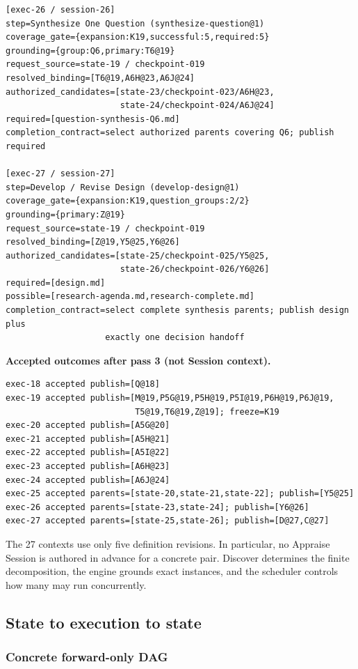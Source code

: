 \documentclass[11pt]{article}
\begin{document}
\begin{lstlisting}[style=playbook,basicstyle=\ttfamily\tiny]
[exec-26 / session-26]
step=Synthesize One Question (synthesize-question@1)
coverage_gate={expansion:K19,successful:5,required:5}
grounding={group:Q6,primary:T6@19}
request_source=state-19 / checkpoint-019
resolved_binding=[T6@19,A6H@23,A6J@24]
authorized_candidates=[state-23/checkpoint-023/A6H@23,
                       state-24/checkpoint-024/A6J@24]
required=[question-synthesis-Q6.md]
completion_contract=select authorized parents covering Q6; publish required

[exec-27 / session-27]
step=Develop / Revise Design (develop-design@1)
coverage_gate={expansion:K19,question_groups:2/2}
grounding={primary:Z@19}
request_source=state-19 / checkpoint-019
resolved_binding=[Z@19,Y5@25,Y6@26]
authorized_candidates=[state-25/checkpoint-025/Y5@25,
                       state-26/checkpoint-026/Y6@26]
required=[design.md]
possible=[research-agenda.md,research-complete.md]
completion_contract=select complete synthesis parents; publish design plus
                    exactly one decision handoff
\end{lstlisting}

\noindent\textbf{Accepted outcomes after pass 3 (not Session context).}
\begin{lstlisting}[style=playbook,basicstyle=\ttfamily\scriptsize]
exec-18 accepted publish=[Q@18]
exec-19 accepted publish=[M@19,P5G@19,P5H@19,P5I@19,P6H@19,P6J@19,
                          T5@19,T6@19,Z@19]; freeze=K19
exec-20 accepted publish=[A5G@20]
exec-21 accepted publish=[A5H@21]
exec-22 accepted publish=[A5I@22]
exec-23 accepted publish=[A6H@23]
exec-24 accepted publish=[A6J@24]
exec-25 accepted parents=[state-20,state-21,state-22]; publish=[Y5@25]
exec-26 accepted parents=[state-23,state-24]; publish=[Y6@26]
exec-27 accepted parents=[state-25,state-26]; publish=[D@27,C@27]
\end{lstlisting}

The 27 contexts use only five definition revisions. In particular, no Appraise
Session is authored in advance for a concrete pair. Discover determines the
finite decomposition, the engine grounds exact instances, and the scheduler
controls how many may run concurrently.

\subsection{State to execution to state}

\subsubsection{Concrete forward-only DAG}
\end{document}
